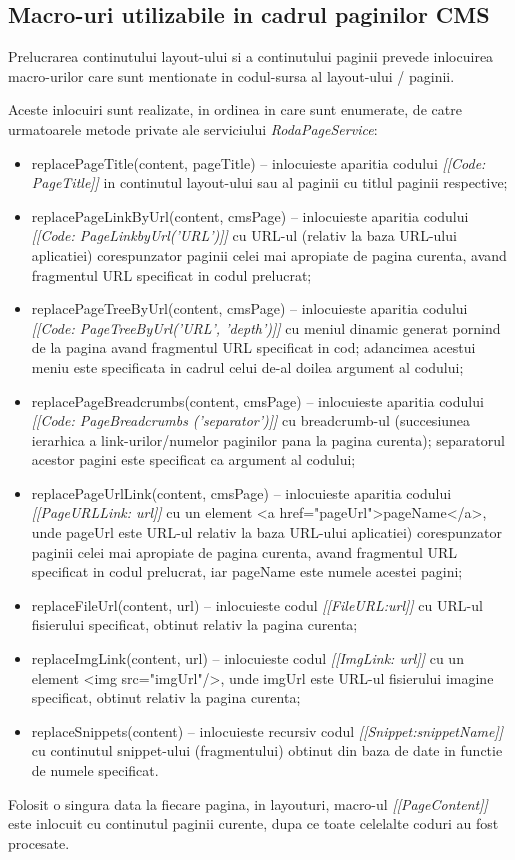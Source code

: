 \subsection{Macro-uri utilizabile in cadrul paginilor CMS}

Prelucrarea continutului layout-ului si a continutului paginii prevede inlocuirea macro-urilor care sunt mentionate in codul-sursa al layout-ului / paginii.

Aceste inlocuiri sunt realizate, in ordinea in care sunt enumerate, de catre urmatoarele metode private ale serviciului \emph{RodaPageService}:
\begin{itemize}
\item{replacePageTitle(content, pageTitle) -- 
inlocuieste aparitia codului \emph{[[Code: PageTitle]]} in continutul layout-ului sau al paginii cu titlul paginii respective;}
\item{replacePageLinkByUrl(content, cmsPage) -- 
inlocuieste aparitia codului \emph{[[Code: PageLinkbyUrl('URL')]]} cu URL-ul (relativ la baza URL-ului aplicatiei) corespunzator paginii celei mai apropiate de pagina curenta, avand fragmentul URL specificat in codul prelucrat;} 
\item{replacePageTreeByUrl(content, cmsPage) -- 
inlocuieste aparitia codului \emph{[[Code: PageTreeByUrl('URL', 'depth')]]} cu meniul dinamic generat pornind de la pagina avand fragmentul URL specificat in cod; adancimea acestui meniu este specificata in cadrul celui de-al doilea argument al codului;}
\item{replacePageBreadcrumbs(content, cmsPage) -- 
inlocuieste aparitia codului \emph{[[Code: PageBreadcrumbs ('separator')]]} cu breadcrumb-ul (succesiunea ierarhica a link-urilor/numelor paginilor pana la pagina curenta); separatorul acestor pagini este specificat ca argument al codului;}
\item{replacePageUrlLink(content, cmsPage) -- 
inlocuieste aparitia codului \emph{[[PageURLLink: url]]} cu un element <a href="pageUrl">pageName</a>, unde pageUrl este URL-ul relativ la baza URL-ului aplicatiei) corespunzator paginii celei mai apropiate de pagina curenta, avand fragmentul URL specificat in codul prelucrat, iar pageName este numele acestei pagini;}
\item{replaceFileUrl(content, url) -- 
inlocuieste codul \emph{[[FileURL:url]]} cu URL-ul fisierului specificat, obtinut relativ la pagina curenta;}
\item{replaceImgLink(content, url) -- 
inlocuieste codul \emph{[[ImgLink: url]]} cu un element <img src="imgUrl"/>, unde imgUrl este URL-ul fisierului imagine specificat, obtinut relativ la pagina curenta;}
\item{replaceSnippets(content) -- 
inlocuieste recursiv codul \emph{[[Snippet:snippetName]]} cu continutul snippet-ului (fragmentului) obtinut din baza de date in functie de numele specificat.}
\end{itemize}

Folosit o singura data la fiecare pagina, in layouturi, macro-ul \emph{[[PageContent]]} este inlocuit cu continutul paginii curente, dupa ce toate celelalte coduri au fost procesate. 

\bigskip


